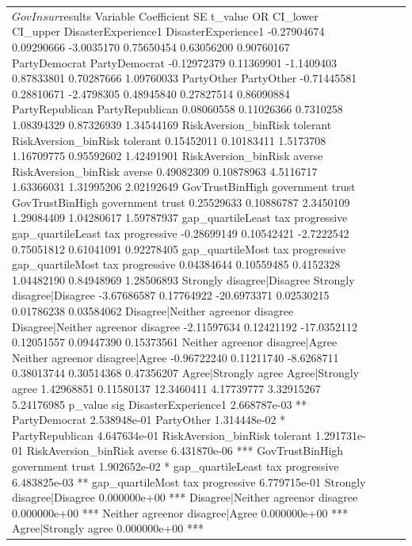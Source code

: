 \begin{table}[!h]
\begin{tabular}[t]{>{\raggedright\arraybackslash}p{6.4cm}ccc}
$GovInsur$results
                                                             Variable Coefficient         SE     t_value         OR   CI_lower   CI_upper
DisasterExperience1                               DisasterExperience1 -0.27904674 0.09290666  -3.0035170 0.75650454 0.63056200 0.90760167
PartyDemocrat                                           PartyDemocrat -0.12972379 0.11369901  -1.1409403 0.87833801 0.70287666 1.09760033
PartyOther                                                 PartyOther -0.71445581 0.28810671  -2.4798305 0.48945840 0.27827514 0.86090884
PartyRepublican                                       PartyRepublican  0.08060558 0.11026366   0.7310258 1.08394329 0.87326939 1.34544169
RiskAversion_binRisk tolerant           RiskAversion_binRisk tolerant  0.15452011 0.10183411   1.5173708 1.16709775 0.95592602 1.42491901
RiskAversion_binRisk averse               RiskAversion_binRisk averse  0.49082309 0.10878963   4.5116717 1.63366031 1.31995206 2.02192649
GovTrustBinHigh government trust     GovTrustBinHigh government trust  0.25529633 0.10886787   2.3450109 1.29084409 1.04280617 1.59787937
gap_quartileLeast tax progressive   gap_quartileLeast tax progressive -0.28699149 0.10542421  -2.7222542 0.75051812 0.61041091 0.92278405
gap_quartileMost tax progressive     gap_quartileMost tax progressive  0.04384644 0.10559485   0.4152328 1.04482190 0.84948969 1.28506893
Strongly disagree|Disagree                 Strongly disagree|Disagree -3.67686587 0.17764922 -20.6973371 0.02530215 0.01786238 0.03584062
Disagree|Neither agreenor disagree Disagree|Neither agreenor disagree -2.11597634 0.12421192 -17.0352112 0.12051557 0.09447390 0.15373561
Neither agreenor disagree|Agree       Neither agreenor disagree|Agree -0.96722240 0.11211740  -8.6268711 0.38013744 0.30514368 0.47356207
Agree|Strongly agree                             Agree|Strongly agree  1.42968851 0.11580137  12.3460411 4.17739777 3.32915267 5.24176985
                                        p_value sig
DisasterExperience1                2.668787e-03  **
PartyDemocrat                      2.538948e-01    
PartyOther                         1.314448e-02   *
PartyRepublican                    4.647634e-01    
RiskAversion_binRisk tolerant      1.291731e-01    
RiskAversion_binRisk averse        6.431870e-06 ***
GovTrustBinHigh government trust   1.902652e-02   *
gap_quartileLeast tax progressive  6.483825e-03  **
gap_quartileMost tax progressive   6.779715e-01    
Strongly disagree|Disagree         0.000000e+00 ***
Disagree|Neither agreenor disagree 0.000000e+00 ***
Neither agreenor disagree|Agree    0.000000e+00 ***
Agree|Strongly agree               0.000000e+00 ***



\end{tabular}
\end{table}
